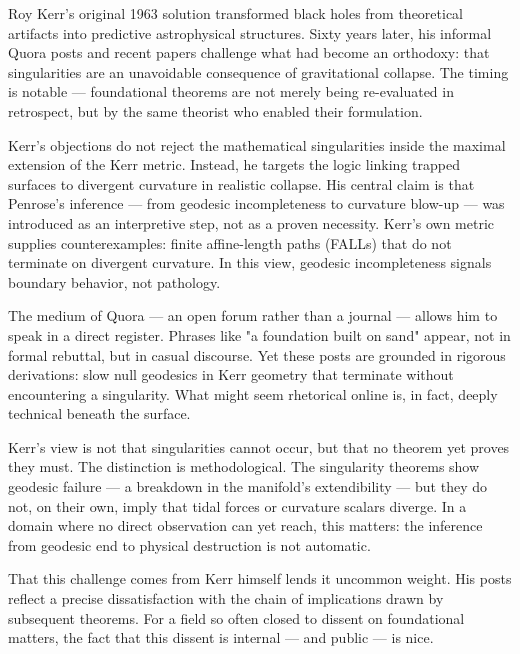 \begin{commentary}
Roy Kerr's original 1963 solution transformed black holes from theoretical artifacts into predictive astrophysical structures. Sixty years later, his informal Quora posts and recent papers challenge what had become an orthodoxy: that singularities are an unavoidable consequence of gravitational collapse. The timing is notable — foundational theorems are not merely being re-evaluated in retrospect, but by the same theorist who enabled their formulation.

Kerr's objections do not reject the mathematical singularities inside the maximal extension of the Kerr metric. Instead, he targets the logic linking trapped surfaces to divergent curvature in realistic collapse. His central claim is that Penrose's inference — from geodesic incompleteness to curvature blow-up — was introduced as an interpretive step, not as a proven necessity. Kerr's own metric supplies counterexamples: finite affine-length paths (FALLs) that do not terminate on divergent curvature. In this view, geodesic incompleteness signals boundary behavior, not pathology.

The medium of Quora — an open forum rather than a journal — allows him to speak in a direct register. Phrases like "a foundation built on sand" appear, not in formal rebuttal, but in casual discourse. Yet these posts are grounded in rigorous derivations: slow null geodesics in Kerr geometry that terminate without encountering a singularity. What might seem rhetorical online is, in fact, deeply technical beneath the surface.

Kerr's view is not that singularities cannot occur, but that no theorem yet proves they must. The distinction is methodological. The singularity theorems show geodesic failure — a breakdown in the manifold's extendibility — but they do not, on their own, imply that tidal forces or curvature scalars diverge. In a domain where no direct observation can yet reach, this matters: the inference from geodesic end to physical destruction is not automatic.

That this challenge comes from Kerr himself lends it uncommon weight. His posts reflect a precise dissatisfaction with the chain of implications drawn by subsequent theorems. For a field so often closed to dissent on foundational matters, the fact that this dissent is internal — and public — is nice.
\end{commentary}

